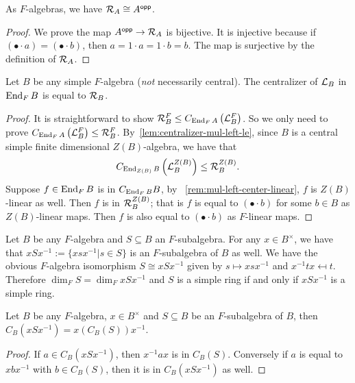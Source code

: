  \begin{lemma}\label{lem:mul-right-iso-opp}
   As $F$-algebras, we have $\mathcal{R}_{A}\cong A^{\mathsf{opp}}$. \leanok
 \end{lemma}
 \begin{proof}
   We prove the map $A^{\mathsf{opp}} \to \mathcal{R}_{A}$ is bijective. It is injective
   because if $\left(\bullet \cdot a\right) = \left(\bullet\cdot b\right)$, then
   $a = 1 \cdot a = 1 \cdot b = b$. The map is surjective by the definition of
   $\mathcal{R}_{A}$.
 \end{proof}
 \begin{lemma}\label{lem:centralizer-mul-left-eq-mul-right}
   Let $B$ be any simple $F$-algebra ({\em not\/} necessarily central). The
   centralizer of $\mathcal{L}_{B}$ in $\operatorname{End}_{F}B$ is equal to $\mathcal{R}_{B}$. \leanok
 \end{lemma}
 \begin{proof}
   It is straightforward to show
   $\mathcal{R}_{B}^{F}\le C_{\operatorname{End}_{F}A}\left(\mathcal{L}_{B}^{F}\right)$. So we only need to
   prove $C_{\operatorname{End}_{F}A}\left(\mathcal{L}_{B}^{F}\right)\le \mathcal{R}_{B}^{F}$.
   By~\cref{lem:centralizer-mul-left-le}, since $B$ is a central simple finite
   dimensional $Z(B)$-algebra, we have that
   \[
     C_{\operatorname{End}_{Z(B)}B}\left(\mathcal{L}_{B}^{Z(B)}\right) \le \mathcal{R}_{B}^{Z(B)}.
   \]
   Suppose $f\in\operatorname{End}_{F}B$ is in $C_{\operatorname{End}_{F}B}B$, by
   ~\cref{rem:mul-left-center-linear}, $f$ is $Z(B)$-linear as well. Then $f$ is
   in $\mathcal{R}_{B}^{Z(B)}$; that is $f$ is equal to $\left(\bullet\cdot b\right)$
   for some $b \in B$ as $Z(B)$-linear maps. Then $f$ is also equal to
   $\left(\bullet\cdot b\right)$ as $F$-linear maps.
 \end{proof}

 \begin{construction}
   Let $B$ be any $F$-algebra and $S\subseteq B$ an $F$-subalgebra. For any
   $x\in B^{\times}$, we have that $x S x^{-1}:=\{xsx^{-1}|s\in S\}$ is an
   $F$-subalgebra of $B$ as well. We have the obvious $F$-algebra isomorphism
   $S \cong xSx^{-1}$ given by $s\mapsto xsx^{-1}$ and $x^{-1}tx\mapsfrom t$.
   Therefore $\dim_{F}S=\dim_{F}xSx^{-1}$ and $S$ is a simple ring if and only
   if $xSx^{-1}$ is a simple ring. \leanok {}
 \end{construction}

 \begin{lemma}
   \label{lem:centralizer-conj}
   Let $B$ be any $F$-algebra, $x \in B^{\times}$ and $S\subseteq B$ be an
   $F$-subalgebra of $B$, then $C_{B}(xSx^{-1})=x\left(C_{B}(S)\right)x^{-1}$.
   \leanok {}
 \end{lemma}
 \begin{proof}
   If $a \in C_{B}\left(xSx^{-1}\right)$, then $x^{-1}ax$ is in $C_{B}(S)$.
   Conversely if $a$ is equal to $xbx^{-1}$ with $b\in C_{B}(S)$, then it is in
   $C_{B}\left(xSx^{-1}\right)$ as well.
 \end{proof}

